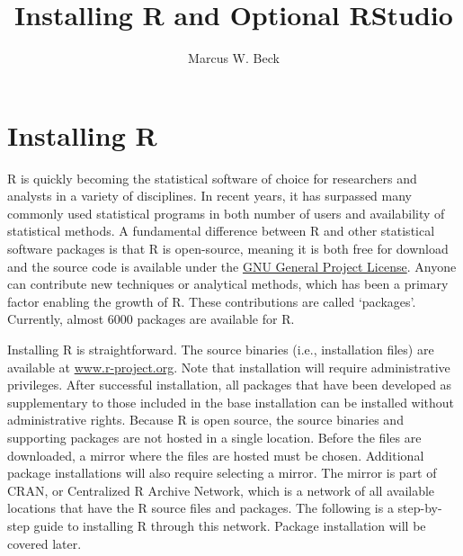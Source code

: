 \documentclass[letterpaper,12pt]{article}\usepackage[]{graphicx}\usepackage[]{color}
\begin{document}
\setlength{\parskip}{5mm}
\setlength{\parindent}{0in}

\title{Installing R and Optional RStudio}
\author{Marcus W. Beck}
\maketitle

\section{Installing R}

R is quickly becoming the statistical software of choice for researchers and analysts in a variety of disciplines.  In recent years, it has surpassed many commonly used statistical programs in both number of users and availability of statistical methods.  A fundamental difference between R and other statistical software packages is that R is open-source, meaning it is both free for download and the source code is available under the \href{http://www.gnu.org/licenses/gpl-2.0.html}{GNU General Project License}.  Anyone can contribute new techniques or analytical methods, which has been a primary factor enabling the growth of R.  These contributions are called `packages'.  Currently, almost 6000 packages are available for R.   

Installing R is straightforward.  The source binaries (i.e., installation files) are available at \href{http://www.r-project.org}{www.r-project.org}.  Note that installation will require administrative privileges.  After successful installation, all packages that have been developed as supplementary to those included in the base installation can be installed without administrative rights.  Because R is open source, the source binaries and supporting packages are not hosted in a single location.  Before the files are downloaded, a mirror where the files are hosted must be chosen.  Additional package installations will also require selecting a mirror.  The mirror is part of CRAN, or Centralized R Archive Network, which is a network of all available locations that have the R source files and packages.  The following is a step-by-step guide to installing R through this network.  Package installation will be covered later.
\end{document}
